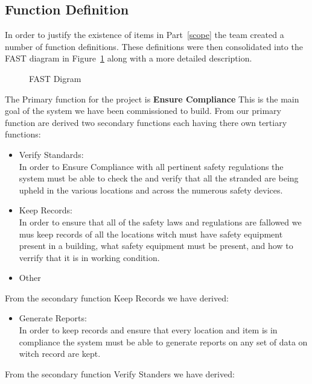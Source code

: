 \documentclass[Letter,11pt]{article}
\begin{document}
	\subsection{Function Definition} 
		In order to justify the existence of items in Part~\ref{scope} the team created a number of function definitions. These definitions were then consolidated into the FAST diagram in Figure~\ref{fast1} along with a more detailed description.
		\begin{figure}[h]
			\centering
			
			\caption{\label{fast1} FAST Digram}
		\end{figure}
		The Primary function for the project is \textbf{Ensure Compliance} This is the main goal of the system we have been commissioned to build. From our primary function are derived two secondary functions each having there own tertiary functions:  
		\begin{itemize}
			\item Verify Standards:\\
			In order to Ensure Compliance with all pertinent safety regulations the system must be able to check the and verify that all the stranded are being upheld in the various locations and across the numerous safety devices.
			\item Keep Records:\\
			In order to ensure that all of the safety laws and regulations are fallowed we mus keep records of all the locations witch must have safety equipment present in a building, what safety equipment must be present, and how to verrify that it is in working condition.  

			\item Other 
		\end{itemize}
		From the secondary function Keep Records we have derived: 
		\begin{itemize}
			\item Generate Reports:\\
			In order to keep records and ensure that every location and item is in compliance the system must be able to generate reports on any set of data on witch record are kept. 
		\end{itemize}
		From the secondary function Verify Standers we have derived:
\end{document}
